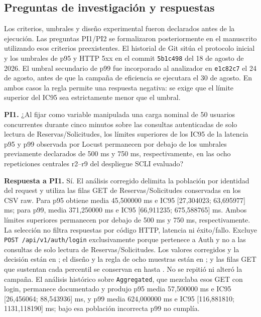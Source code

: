 \subsection{Preguntas de investigación y respuestas}
\label{subsec:preguntas-investigacion}

Los criterios, umbrales y diseño experimental fueron declarados antes de la
ejecución. Las preguntas PI1/PI2 se formalizaron posteriormente en el manuscrito
utilizando esos criterios preexistentes. El historial de Git sitúa el protocolo
inicial y los umbrales de p95 y HTTP 5xx en el commit
\texttt{5b1c498} del 18 de agosto de 2026. El umbral secundario de p99 fue
incorporado al analizador en \texttt{e1c82c7} el 24 de agosto, antes de que la
campaña de eficiencia se ejecutara el 30 de agosto. En ambos casos la regla
permite una respuesta negativa: se exige que el límite superior del IC95 sea
estrictamente menor que el umbral.

\textbf{PI1.} ¿Al fijar como variable manipulada una carga nominal de 50
usuarios concurrentes durante cinco minutos sobre las consultas autenticadas
de solo lectura de Reservas/Solicitudes, los límites superiores de los IC95 de
la latencia p95 y p99 observada por Locust permanecen por debajo de los
umbrales previamente declarados de 500 ms y 750 ms, respectivamente, en las
ocho repeticiones centrales r2--r9 del despliegue SCLI evaluado?

\textbf{Respuesta a PI1.} Sí. El análisis corregido delimita la población por
identidad del request y utiliza las filas GET de Reservas/Solicitudes conservadas
en los CSV raw. Para p95 obtiene media 45,500000 ms e IC95
[27,304023; 63,695977] ms; para p99, media 371,250000 ms e IC95
[66,911235; 675,588765] ms. Ambos límites superiores permanecen por debajo de
500 ms y 750 ms, respectivamente. La selección no filtra respuestas por código
HTTP, latencia ni éxito/fallo. Excluye \texttt{POST /api/v1/auth/login}
exclusivamente porque pertenece a Auth y no a las consultas de solo lectura de
Reservas/Solicitudes. Los valores corregidos y la decisión están en
; el diseño y la
regla de ocho muestras están en
; y las filas GET que sustentan cada
percentil se conservan en
hasta . No se repitió ni alteró la campaña.
El análisis histórico sobre \texttt{Aggregated}, que mezclaba esos GET con
login, permanece documentado y produjo p95 media 57,500000 ms e IC95
[26,456064; 88,543936] ms, y p99 media 624,000000 ms e IC95
[116,881810; 1131,118190] ms; bajo esa población incorrecta p99 no cumplía.


